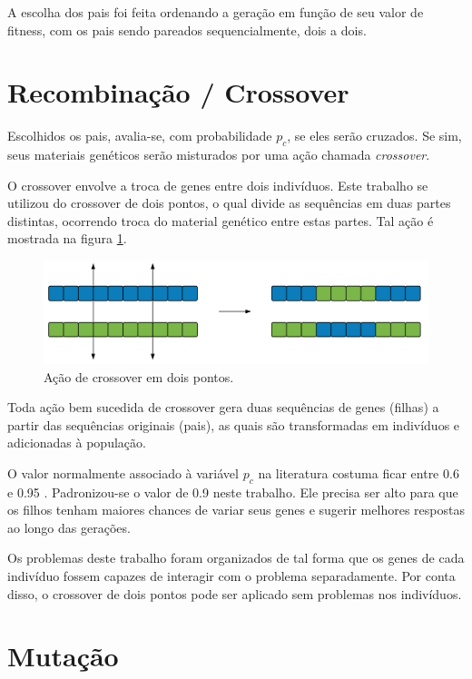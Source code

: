 A escolha dos pais foi feita ordenando a geração em função de seu valor de fitness, com os pais sendo pareados sequencialmente, dois a dois.

\section{Recombinação / Crossover}

Escolhidos os pais, avalia-se, com probabilidade $p_c$, se eles serão cruzados. Se sim, seus materiais genéticos serão misturados por uma ação chamada \emph{crossover}.

O crossover envolve a troca de genes entre dois indivíduos. Este trabalho se utilizou do crossover de dois pontos, o qual divide as sequências em duas partes distintas, ocorrendo troca do material genético entre estas partes. Tal ação é mostrada na figura \ref{fig:crossover}.

\begin{figure}[ht!]
    \centering \includegraphics[width=1.0\textwidth]{crossover.png}
    \caption{Ação de crossover em dois pontos.}
    \label{fig:crossover}
\end{figure}

Toda ação bem sucedida de crossover gera duas sequências de genes (filhas) a partir das sequências originais (pais), as quais são transformadas em indivíduos e adicionadas à população.

O valor normalmente associado à variável $p_c$ na literatura costuma ficar entre 0.6 e 0.95 \cite{dejong1975analysis, eiben2011parameter, obitkopc}. Padronizou-se o valor de 0.9 neste trabalho. Ele precisa ser alto para que os filhos tenham maiores chances de variar seus genes e sugerir melhores respostas ao longo das gerações.

Os problemas deste trabalho foram organizados de tal forma que os genes de cada indivíduo fossem capazes de interagir com o problema separadamente. Por conta disso, o crossover de dois pontos pode ser aplicado sem problemas nos indivíduos.

\section{Mutação}

